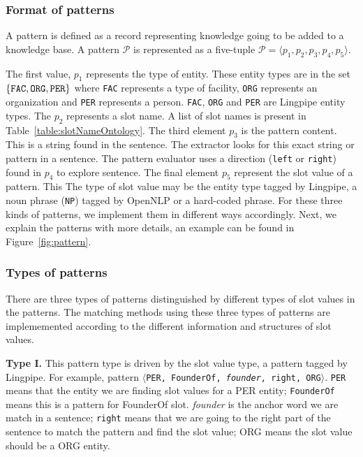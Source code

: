 \subsubsection{Format of patterns}
A pattern is defined as a record representing knowledge going to be added to a knowledge base. A pattern $\mathcal{P}$ is represented as a five-tuple $\mathcal{P} = \langle p_1, p_2, p_3, p_4, p_5 \rangle$.


The first value, $p_1$ represents the type of entity. These entity types are in the set $\{ \text{\tt FAC}, \text{\tt ORG}, \text{\tt PER} \}$ where \texttt{FAC} represents a type of facility, \texttt{ORG} represents an organization and \texttt{PER} represents a person. \texttt{FAC}, \texttt{ORG} and \texttt{PER} are Lingpipe entity types. The $p_2$ represents a slot name. A list of slot names is present in Table~\ref{table:slotNameOntology}. The third element $p_3$ is the pattern content. This is a string found in the sentence. The extractor looks for this exact string or pattern in a sentence. The pattern evaluator uses a direction (\texttt{left} or \texttt{right}) found in $p_4$ to explore sentence. The final element $p_5$ represent the slot value of a pattern. This %
The type of slot value may be the entity type tagged by Lingpipe, a noun phrase (\texttt{NP}) tagged by OpenNLP or a hard-coded phrase. For these three kinds of patterns, we implement them in different 
ways accordingly. Next, we explain the patterns with more details, an example can be found in Figure~\ref{fig:pattern}. 



\subsubsection{Types of patterns}
There are three types of patterns distinguished by different types of slot values in the patterns. The matching methods using these three types of patterns are implememented according to the different information and structures of slot values.

 
\textbf{Type I.} This pattern type is driven by the slot value type, a pattern tagged by Lingpipe. For example, pattern $\langle$\texttt{PER, FounderOf, \textit{founder}, right, ORG}$\rangle$. \texttt{PER} means 
that the entity we are finding slot values for a PER entity; \texttt{FounderOf} means this is a pattern for FounderOf slot. \textit{founder} is the anchor word we are match in a sentence; \texttt{right} means that we are going to the right part of the sentence to match the pattern and find the slot value; ORG means the slot value should be a ORG entity.

